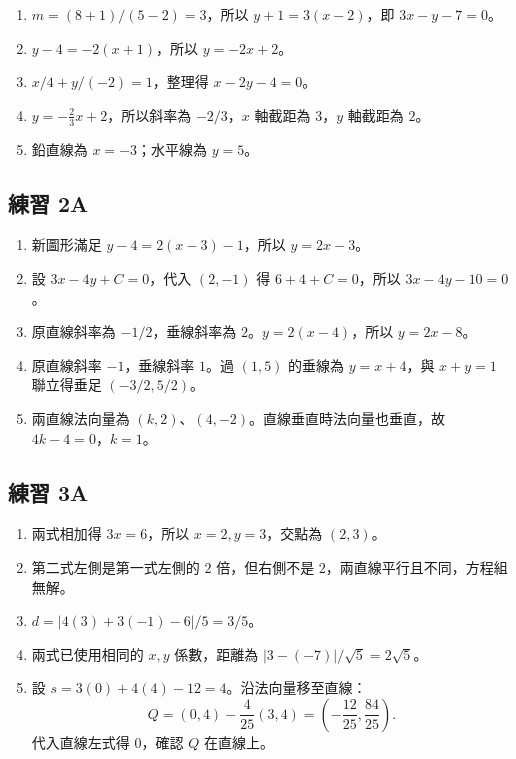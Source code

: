 \documentclass[11pt,a4paper]{article}
\providecommand{\tightlist}{%
  \setlength{\itemsep}{0pt}\setlength{\parskip}{0pt}}
\begin{document}
\begin{enumerate}
\def\labelenumi{\arabic{enumi}.}
\tightlist
\item
  \(m=(8+1)/(5-2)=3\)，所以 \(y+1=3(x-2)\)，即 \(\boxed{3x-y-7=0}\)。
\item
  \(y-4=-2(x+1)\)，所以 \(\boxed{y=-2x+2}\)。
\item
  \(x/4+y/(-2)=1\)，整理得 \(\boxed{x-2y-4=0}\)。
\item
  \(y=-\frac23x+2\)，所以斜率為 \(\boxed{-2/3}\)，\(x\) 軸截距為 \(\boxed3\)，\(y\) 軸截距為 \(\boxed2\)。
\item
  鉛直線為 \(\boxed{x=-3}\)；水平線為 \(\boxed{y=5}\)。
\end{enumerate}

\subsection{練習 2A}\label{ux7df4ux7fd2-2a-1}

\begin{enumerate}
\def\labelenumi{\arabic{enumi}.}
\tightlist
\item
  新圖形滿足 \(y-4=2(x-3)-1\)，所以 \(\boxed{y=2x-3}\)。
\item
  設 \(3x-4y+C=0\)，代入 \((2,-1)\) 得 \(6+4+C=0\)，所以 \(\boxed{3x-4y-10=0}\)。
\item
  原直線斜率為 \(-1/2\)，垂線斜率為 \(2\)。\(y=2(x-4)\)，所以 \(\boxed{y=2x-8}\)。
\item
  原直線斜率 \(-1\)，垂線斜率 \(1\)。過 \((1,5)\) 的垂線為 \(y=x+4\)，與 \(x+y=1\) 聯立得垂足 \(\boxed{(-3/2,5/2)}\)。
\item
  兩直線法向量為 \((k,2)\)、\((4,-2)\)。直線垂直時法向量也垂直，故 \(4k-4=0\)，\(\boxed{k=1}\)。
\end{enumerate}

\subsection{練習 3A}\label{ux7df4ux7fd2-3a-1}

\begin{enumerate}
\def\labelenumi{\arabic{enumi}.}
\tightlist
\item
  兩式相加得 \(3x=6\)，所以 \(x=2,y=3\)，交點為 \(\boxed{(2,3)}\)。
\item
  第二式左側是第一式左側的 \(2\) 倍，但右側不是 \(2\)，兩直線平行且不同，方程組 \(\boxed{\text{無解}}\)。
\item
  \(d=|4(3)+3(-1)-6|/5=\boxed{3/5}\)。
\item
  兩式已使用相同的 \(x,y\) 係數，距離為 \(|3-(-7)|/\sqrt5=\boxed{2\sqrt5}\)。
\item
  設 \(s=3(0)+4(4)-12=4\)。沿法向量移至直線：
  \[
  Q=(0,4)-\frac4{25}(3,4)=\boxed{\left(-\frac{12}{25},\frac{84}{25}\right)}.
  \]
  代入直線左式得 \(0\)，確認 \(Q\) 在直線上。
\end{enumerate}
\end{document}
